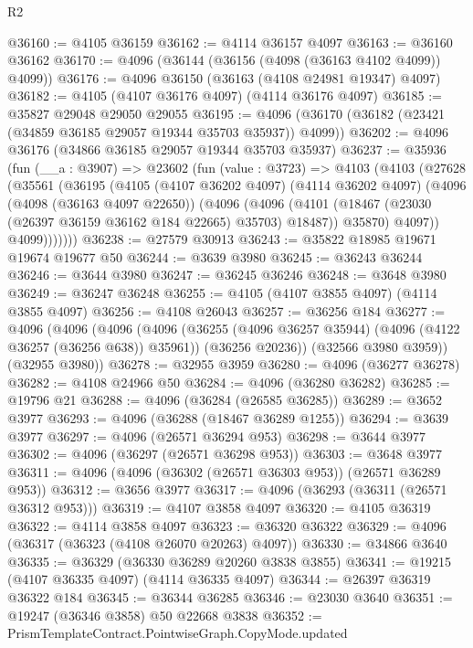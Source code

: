 \begin{lexlean}{R2}
\begin{coremodule}
@36160 := @4105 @36159
@36162 := @4114 @36157 @4097
@36163 := @36160 @36162
@36170 := @4096 (@36144 (@36156 (@4098 (@36163 @4102 @4099)) @4099))
@36176 := @4096 @36150 (@36163 (@4108 @24981 @19347) @4097)
@36182 := @4105 (@4107 @36176 @4097) (@4114 @36176 @4097)
@36185 := @35827 @29048 @29050 @29055
@36195 := @4096 (@36170 (@36182 (@23421 (@34859 @36185 @29057 @19344 @35703 @35937)) @4099))
@36202 := @4096 @36176 (@34866 @36185 @29057 @19344 @35703 @35937)
@36237 := @35936
    (fun (__a : @3907) =>
    @23602
      (fun (value : @3723) =>
      @4103
        (@4103
          (@27628
            (@35561
              (@36195
                (@4105
                  (@4107 @36202 @4097)
                  (@4114 @36202 @4097)
                  (@4096
                    (@4098 (@36163 @4097 @22650))
                    (@4096
                      (@4096
                        (@4101 (@18467 (@23030 (@26397 @36159 @36162 @184 @22665) @35703) @18487))
                        @35870)
                      @4097))
                  @4099)))))))
@36238 := @27579 @30913
@36243 := @35822 @18985 @19671 @19674 @19677 @50
@36244 := @3639 @3980
@36245 := @36243 @36244
@36246 := @3644 @3980
@36247 := @36245 @36246
@36248 := @3648 @3980
@36249 := @36247 @36248
@36255 := @4105 (@4107 @3855 @4097) (@4114 @3855 @4097)
@36256 := @4108 @26043
@36257 := @36256 @184
@36277 := @4096
    (@4096
      (@4096
        (@4096
          (@36255 (@4096 @36257 @35944) (@4096 (@4122 @36257 (@36256 @638)) @35961))
          (@36256 @20236))
        (@32566 @3980 @3959))
      (@32955 @3980))
@36278 := @32955 @3959
@36280 := @4096 (@36277 @36278)
@36282 := @4108 @24966 @50
@36284 := @4096 (@36280 @36282)
@36285 := @19796 @21
@36288 := @4096 (@36284 (@26585 @36285))
@36289 := @3652 @3977
@36293 := @4096 (@36288 (@18467 @36289 @1255))
@36294 := @3639 @3977
@36297 := @4096 (@26571 @36294 @953)
@36298 := @3644 @3977
@36302 := @4096 (@36297 (@26571 @36298 @953))
@36303 := @3648 @3977
@36311 := @4096 (@4096 (@36302 (@26571 @36303 @953)) (@26571 @36289 @953))
@36312 := @3656 @3977
@36317 := @4096 (@36293 (@36311 (@26571 @36312 @953)))
@36319 := @4107 @3858 @4097
@36320 := @4105 @36319
@36322 := @4114 @3858 @4097
@36323 := @36320 @36322
@36329 := @4096 (@36317 (@36323 (@4108 @26070 @20263) @4097))
@36330 := @34866 @3640
@36335 := @36329 (@36330 @36289 @20260 @3838 @3855)
@36341 := @19215 (@4107 @36335 @4097) (@4114 @36335 @4097)
@36344 := @26397 @36319 @36322 @184
@36345 := @36344 @36285
@36346 := @23030 @3640
@36351 := @19247 (@36346 @3858) @50 @22668 @3838
@36352 := PrismTemplateContract.PointwiseGraph.CopyMode.updated

\end{coremodule}
\end{lexlean}
